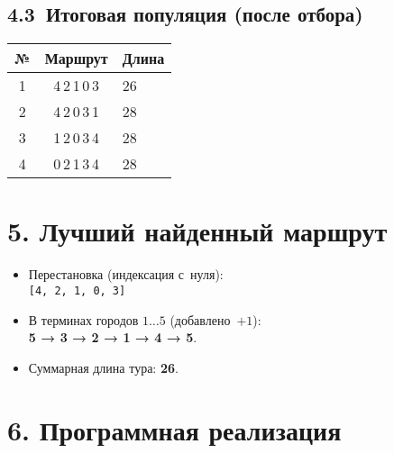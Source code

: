 \documentclass[a4paper,12pt]{article}
\newcommand{\code}[1]{\texttt{#1}}
\begin{document}
\subsection*{4.3 Итоговая популяция (после отбора)}

\begin{center}
\begin{tabular}{ccl}
\toprule
№ & Маршрут & Длина\\\midrule
1 & 4\,2\,1\,0\,3 & 26\\
2 & 4\,2\,0\,3\,1 & 28\\
3 & 1\,2\,0\,3\,4 & 28\\
4 & 0\,2\,1\,3\,4 & 28\\
\bottomrule
\end{tabular}
\end{center}

\section*{5. Лучший найденный маршрут}

\begin{itemize}
  \item Перестановка (индексация с нуля):\\
        \code{[4, 2, 1, 0, 3]}
  \item В терминах городов $1\!\dots 5$ (добавлено $+1$):\\
        \textbf{5 → 3 → 2 → 1 → 4 → 5}.
  \item Суммарная длина тура: \textbf{26}.
\end{itemize}

\section*{6. Программная реализация}
\end{document}
